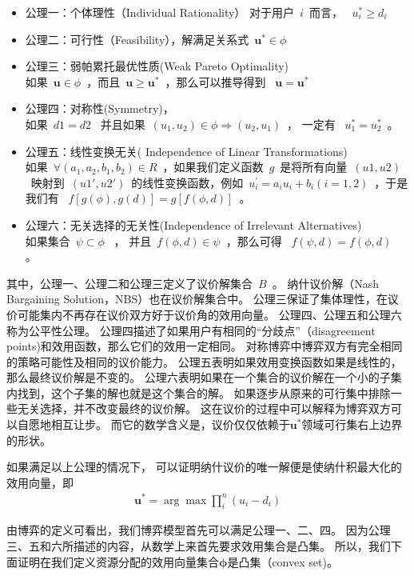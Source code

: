 \begin{itemize}
\item 公理一：个体理性（Individual Rationality） 
    对于用户~$i$~而言， ~$u_i^* \ge d_i$~
\item 公理二：可行性（Feasibility），解满足关系式~$\mathbf{u}^* \in \phi$~
\item 公理三：弱帕累托最优性质(Weak Pareto Optimality)\\
如果~$\mathbf{u} \in \phi$~，而且~$\mathbf{u} \ge \mathbf{u}^*$~，那么可以推导得到 ~$\mathbf{u} = \mathbf{u}^*$~
\item 公理四：对称性(Symmetry)，\\
如果~$d1=d2$~ 并且如果~$(u_1, u_2) \in \phi \Rightarrow (u_2, u_1) $~， 一定有 ~$u_1^*= u_2^*$~。
\item 公理五：线性变换无关( Independence of Linear Transformations)\\ 
如果~$\forall (a_1, a_2, b_1, b_2) \in R$~，如果我们定义函数~$g$~是将所有向量~$(u1, u2)$~映射到~$(u1', u2')$~的线性变换函数，例如~$u_i^\prime=a_iu_i+ b_i (i =1,2)$~，于是我们有 ~$f[g(\phi), g(d)]=g[f(\phi , d)]$~。
\item 公理六：无关选择的无关性(Independence of Irrelevant Alternatives) \\
如果集合~$\psi \subset \phi$~ ，
并且~$f(\phi,d) \in \psi$~，那么可得 ~$f(\psi,d) = f(\phi,d)$~ 。
\end{itemize}
其中，公理一、公理二和公理三定义了议价解集合~$B$~。
纳什议价解（Nash Bargaining Solution，NBS）也在议价解集合中。
公理三保证了集体理性，在议价可能集内不再存在议价双方好于议价角的效用向量。
公理四、公理五和公理六称为公平性公理。
公理四描述了如果用户有相同的“分歧点”（disagreement points)和效用函数，那么它们的效用一定相同。
对称博弈中博弈双方有完全相同的策略可能性及相同的议价能力。
公理五表明如果效用变换函数如果是线性的，那么最终议价解是不变的。
公理六表明如果在一个集合的议价解在一个小的子集内找到，这个子集的解也就是这个集合的解。
如果逐步从原来的可行集中排除一些无关选择，并不改变最终的议价解。
这在议价的过程中可以解释为博弈双方可以自愿地相互让步。
而它的数学含义是，议价仅仅依赖于$\mathbf{u}^*$领域可行集右上边界的形状。

如果满足以上公理的情况下，
可以证明纳什议价的唯一解便是使纳什积最大化的效用向量\cite{Nash_1950}，即
\begin{align}
\mathbf{u}^* = \arg \max \prod_i^n (u_i-d_i)
\label{eqn:chap_nash:nash_product}
\end{align}


由博弈的定义可看出，我们博弈模型首先可以满足公理一、二、四。
因为公理三、五和六所描述的内容，从数学上来首先要求效用集合是凸集。
所以，我们下面证明在我们定义资源分配的效用向量集合$\mathbf{\phi}$是凸集（convex set)。

